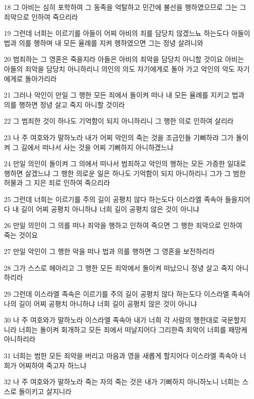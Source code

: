 \par 18 그 아비는 심히 포학하여 그 동족을 억탈하고 민간에 불선을 행하였으므로 그는 그 죄악으로 인하여 죽으리라
\par 19 그런데 너희는 이르기를 아들이 어찌 아비의 죄를 담당치 않겠느뇨 하는도다 아들이 법과 의를 행하며 내 모든 율례를 지켜 행하였으면 그는 정녕 살려니와
\par 20 범죄하는 그 영혼은 죽을지라 아들은 아비의 죄악을 담당치 아니할 것이요 아비는 아들의 죄악을 담당치 아니하리니 의인의 의도 자기에게로 돌아 가고 악인의 악도 자기에게로 돌아가리라
\par 21 그러나 악인이 만일 그 행한 모든 죄에서 돌이켜 떠나 내 모든 율례를 지키고 법과 의를 행하면 정녕 살고 죽지 아니할 것이라
\par 22 그 범죄한 것이 하나도 기억함이 되지 아니하리니 그 행한 의로 인하여 살리라
\par 23 나 주 여호와가 말하노라 내가 어찌 악인의 죽는 것을 조금인들 기뻐하랴 그가 돌이켜 그 길에서 떠나서 사는 것을 어찌 기뻐하지 아니하겠느냐
\par 24 만일 의인이 돌이켜 그 의에서 떠나서 범죄하고 악인의 행하는 모든 가증한 일대로 행하면 살겠느냐 그 행한 의로운 일은 하나도 기억함이 되지 아니하리니 그가 그 범한 허물과 그 지은 죄로 인하여 죽으리라
\par 25 그런데 너희는 이르기를 주의 길이 공평치 않다 하는도다 이스라엘 족속아 들을지어다 내 길이 어찌 공평치 아니하냐 너희 길이 공평치 않은 것이 아니냐
\par 26 만일 의인이 그 의를 떠나 죄악을 행하고 인하여 죽으면 그 행한 죄악으로 인하여 죽는 것이요
\par 27 만일 악인이 그 행한 악을 떠나 법과 의를 행하면 그 영혼을 보전하리라
\par 28 그가 스스로 헤아리고 그 행한 모든 죄악에서 돌이켜 떠났으니 정녕 살고 죽지 아니하리라
\par 29 그런데 이스라엘 족속은 이르기를 주의 길이 공평치 않다 하는도다 이스라엘 족속아 나의 길이 어찌 공평치 아니하냐 너희 길이 공평치 않은 것이 아니냐
\par 30 나 주 여호와가 말하노라 이스라엘 족속아 내가 너희 각 사람의 행한대로 국문할지니라 너희는 돌이켜 회개하고 모든 죄에서 떠날지어다 그리한즉 죄악이 너희를 패망케 아니하리라
\par 31 너희는 범한 모든 죄악을 버리고 마음과 영을 새롭게 할지어다 이스라엘 족속아 너희가 어찌하여 죽고자 하느냐
\par 32 나 주 여호와가 말하노라 죽는 자의 죽는 것은 내가 기뻐하지 아니하노니 너희는 스스로 돌이키고 살지니라

